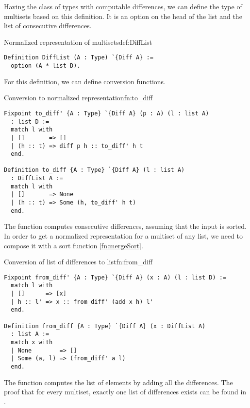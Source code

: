 Having the class of types with computable differences, we can define the type of multisets based on this definition. It is an option on the head of the list and the list of consecutive differences.
\begin{defi}{Normalized representation of multisets}{def:DiffList}
\begin{verbatim}
Definition DiffList (A : Type) `{Diff A} :=
  option (A * list D).
\end{verbatim}
\end{defi}
For this definition, we can define conversion functions.
\begin{func}{Conversion to normalized representation}{fn:to_diff}
\begin{verbatim}
Fixpoint to_diff' {A : Type} `{Diff A} (p : A) (l : list A) 
  : list D :=
  match l with
  | []       => []
  | (h :: t) => diff p h :: to_diff' h t
  end.

Definition to_diff {A : Type} `{Diff A} (l : list A) 
  : DiffList A :=
  match l with
  | []       => None
  | (h :: t) => Some (h, to_diff' h t)
  end.
\end{verbatim}
\end{func}
The function  computes consecutive differences, assuming that the input is sorted. In order to get a normalized representation for a multiset of any list, we need to compose it with a sort function \ref{fn:mergeSort}.
\begin{func}{Conversion of list of differences to list}{fn:from_diff}
\begin{verbatim}
Fixpoint from_diff' {A : Type} `{Diff A} (x : A) (l : list D) :=
  match l with
  | []      => [x]
  | h :: l' => x :: from_diff' (add x h) l'
  end.

Definition from_diff {A : Type} `{Diff A} (x : DiffList A) 
  : list A :=
  match x with
  | None        => []
  | Some (a, l) => (from_diff' a l)
  end.
\end{verbatim}
\end{func}
The function  computes the list of elements by adding all the differences. The proof that for every multiset, exactly one list of differences exists can be found in .
